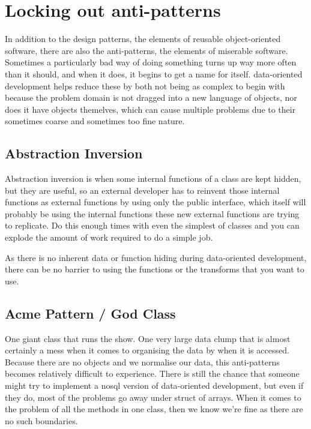 \section{Locking out anti-patterns}

In addition to the design patterns, the elements of reusable object-oriented
software, there are also the anti-patterns, the elements of miserable software.
Sometimes a particularly bad way of doing something turns up way more often
than it should, and when it does, it begins to get a name for itself.
data-oriented development helps reduce these by both not being as complex to
begin with because the problem domain is not dragged into a new language of
objects, nor does it have objects themelves, which can cause multiple problems
due to their sometimes coarse and sometimes too fine nature.

\subsection{Abstraction Inversion}

Abstraction inversion is when some internal functions of a class are kept
hidden, but they are useful, so an external developer has to reinvent those
internal functions as external functions by using only the public interface,
which itself will probably be using the internal functions these new external
functions are trying to replicate. Do this enough times with even the simplest
of classes and you can explode the amount of work required to do a simple job.

As there is no inherent data or function hiding during data-oriented
development, there can be no barrier to using the functions or the transforms
that you want to use.

\subsection{Acme Pattern / God Class}

One giant class that runs the show. One very large data clump that is almost
certainly a mess when it comes to organising the data by when it is accessed.
Because there are no objects and we normalise our data, this anti-patterns
becomes relatively difficult to experience. There is still the chance that
someone might try to implement a nosql version of data-oriented development,
but even if they do, most of the problems go away under struct of arrays. When
it comes to the problem of all the methods in one class, then we know we're
fine as there are no such boundaries.

